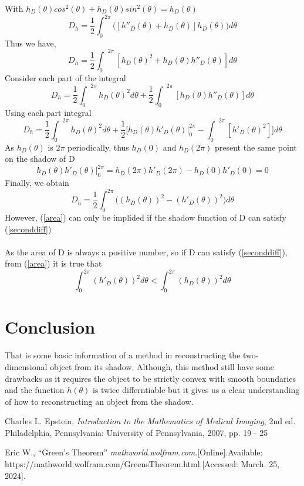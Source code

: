 \documentclass[a4paper]{article}
\begin{document}
With $h_D(\theta)cos^2(\theta) + h_D(\theta)sin^2(\theta) = h_D(\theta)$
\begin{equation*}
    D_h = \frac{1}{2} \int_0^{2\pi} \big( \left[ h''_D(\theta) + h_D(\theta)\right] h_D(\theta)\big)d\theta
\end{equation*}
Thus we have,
\begin{equation*}
    D_h = \frac{1}{2} {\int_0}^{2\pi} \left[h_D(\theta)^2 + h_D(\theta)h''_D(\theta)\right] d\theta
\end{equation*}
Consider each part of the integral
\begin{equation*}
    D_h = \frac{1}{2} {\int_0}^{2\pi} h_D(\theta)^2 d\theta + \frac{1}{2} {\int_0}^{2\pi} \left[ h_D(\theta)h''_D(\theta)\right] d\theta
\end{equation*}
Using each part integral
\begin{equation*}
    D_h = \frac{1}{2} {\int_0}^{2\pi} h_D(\theta)^2 d\theta + \frac{1}{2} \bigg[ h_D(\theta)h'_D(\theta)\Big|_0^{2\pi} - {\int_0}^{2\pi} \left[ h'_D(\theta)^2\right]\bigg] d\theta
\end{equation*}
As $h_D(\theta)$ is $2\pi$ periodically, thus $h_D(0)$ and $h_D(2\pi)$ present the same point on the shadow of D
\begin{equation*}
    h_D(\theta)h'_D(\theta)\Big|_0^{2\pi} = h_D(2\pi)h'_D(2\pi) - h_D(0)h'_D(0) = 0
\end{equation*}
Finally, we obtain
\begin{equation}\label{area}
    D_h = \frac{1}{2} \int_0^{2\pi} \big((h_D(\theta))^2 - (h'_D(\theta))^2\big) d\theta
\end{equation}
However, (\ref{area}) can only be implided if the shadow function of D can satisfy (\ref{seconddiff})\\ \\
As the area of D is always a positive number, so if D can satisfy (\ref{seconddiff}), from (\ref{area}) it is true that
\begin{equation*}
    \int_0^{2\pi} (h'_D(\theta))^2 d\theta < \int_0^{2\pi} (h_D(\theta))^2 d\theta
\end{equation*}
\section{Conclusion}
That is some basic information of a method in reconstructing the two-dimensional object from its shadow. Although, this method still have some drawbacks as it requires the object to be strictly convex with smooth boundaries and the function $h(\theta)$ is twice differntiable but it gives us a clear understanding of how to reconstructing an object from the shadow. 
\begin{thebibliography}{200}

    Charles L. Epstein,\textit{ Introduction to the Mathematics
    of Medical Imaging}, 2nd ed. Philadelphia, Pennsylvania: University of Pennsylvania, 2007, pp. 19 - 25

    Eric W., ``Green's Theorem'' \textit{mathworld.wolfram.com}.[Online].Available: https://mathworld.wolfram.com/GreensTheorem.html.[Accessed: March. 25, 2024].
\end{thebibliography}
\end{document}
